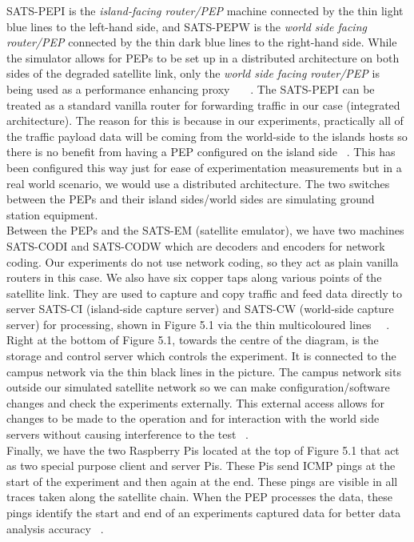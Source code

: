 SATS-PEPI is the \emph{island-facing router/PEP} machine connected by the thin light blue lines to the left-hand side, and SATS-PEPW is the \emph{world side facing router/PEP} connected by the thin dark blue lines to the right-hand side. While the simulator allows for PEPs to be set up in a distributed architecture on both sides of the degraded satellite link, only the \emph{world side facing router/PEP} is being used as a performance enhancing proxy ~\cite{4}~\cite{5}~\cite{21}. The SATS-PEPI can be treated as a standard vanilla router for forwarding traffic in our case (integrated architecture). The reason for this is because in our experiments, practically all of the traffic payload data will be coming from the world-side to the islands hosts so there is no benefit from having a PEP configured on the island side ~\cite{21}. This has been configured this way just for ease of experimentation measurements but in a real world scenario, we would use a distributed architecture. The two switches between the PEPs and their island sides/world sides are simulating ground station equipment.\\ 

Between the PEPs and the SATS-EM (satellite emulator), we have two machines SATS-CODI and SATS-CODW which are decoders and encoders for network coding. Our experiments do not use network coding, so they act as plain vanilla routers in this case. We also have six copper taps along various points of the satellite link. They are used to capture and copy traffic and feed data directly to server SATS-CI  (island-side capture server) and SATS-CW (world-side capture server) for processing, shown in Figure 5.1 via the thin multicoloured lines ~\cite{20}~\cite{21}. \\

Right at the bottom of Figure 5.1, towards the centre of the diagram, is the storage and control server which controls the experiment. It is connected to the campus network via the thin black lines in the picture. The campus network sits outside our simulated satellite network so we can make configuration/software changes and check the experiments externally. This external access allows for changes to be made to the operation and for interaction with the world side servers without causing interference to the test ~\cite{21}. \\

Finally, we have the two Raspberry Pis located at the top of Figure 5.1 that act as two special purpose client and server Pis. These Pis send ICMP pings at the start of the experiment and then again at the end. These pings are visible in all traces taken along the satellite chain. When the PEP processes the data, these pings identify the start and end of an experiments captured data for better data analysis accuracy ~\cite{21}. 

